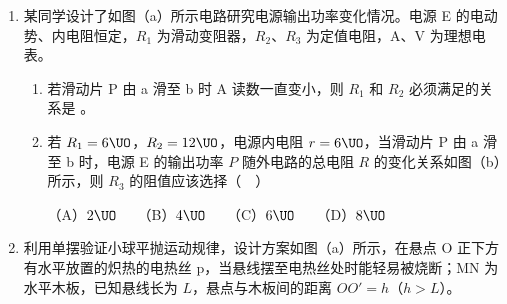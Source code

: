 \documentclass[\gkver]{gaokaozhenti}
\begin{document}
\begin{enumerate}
{（2）在等效替代法测电阻的实验中，两次电流表示数相等，说明两次电路中的电阻相同，即电阻箱和待测电阻的阻值等效，故调节电阻箱的阻值，使电流表的示数为 $I$，此时 $R_{x}=R_{0}$。
}

\item
某同学设计了如图（a）所示电路研究电源输出功率变化情况。电源 E 的电动势、内电阻恒定，$R_{1}$ 为滑动变阻器，$R_{2}$、$R_{3}$ 为定值电阻，A、V 为理想电表。

\begin{enumerate}
	\item
	若滑动片 P 由 a 滑至 b 时 A 读数一直变小，则 $R_{1}$ 和 $R_{2}$ 必须满足的关系是 。
	\item
	若 $R_{1}=6\UO$，$R_{2}=12\UO$，电源内电阻 $r=6\UO$，当滑动片 P 由 a 滑至 b 时，电源 E 的输出功率 $P$ 随外电路的总电阻 $R$ 的变化关系如图（b）所示，则 $R_{3}$ 的阻值应该选择（　）

	（A）$2\UO$　　（B）$4\UO$　　（C）$6\UO$　　（D）$8\UO$
\end{enumerate}

\twopicture[labelA=2007上海16a, labelB=2007上海16b, align=right, wA=4.00cm, wB=4.60cm]
{}
{}



\item
利用单摆验证小球平抛运动规律，设计方案如图（a）所示，在悬点 O 正下方有水平放置的炽热的电热丝 p，当悬线摆至电热丝处时能轻易被烧断；MN 为水平木板，已知悬线长为 $L$，悬点与木板间的距离 $OO'=h$（$h>L$）。


\end{enumerate}
\end{document}
